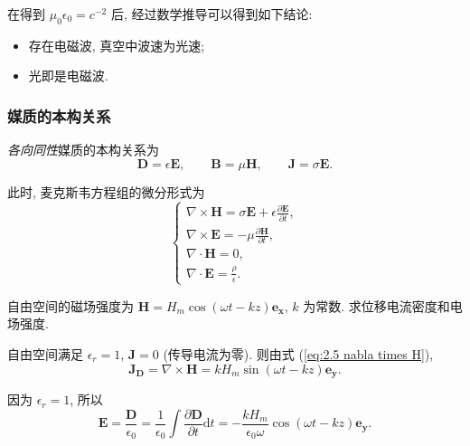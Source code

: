 在得到 $\mu_0\epsilon_0=c^{-2}$ 后, 经过数学推导可以得到如下结论:
\begin{itemize}
    \item 存在电磁波, 真空中波速为光速;
    \item 光即是电磁波.
\end{itemize}

\subsubsection{媒质的本构关系}
\textit{各向同性}媒质的本构关系为
\begin{equation} \label{eq:2.6 D B J}
    \bm{D}=\epsilon\bm{E}, \qquad \bm{B}=\mu\bm{H}, \qquad \bm{J}=\sigma\bm{E}.
\end{equation}

此时, 麦克斯韦方程组的微分形式为
\begin{equation}
    \begin{cases}
        \nabla\times\bm{H}=\sigma\bm{E}+\epsilon\frac{\partial\bm{E}}{\partial t}, \\
        \nabla\times\bm{E}=-\mu\frac{\partial\bm{H}}{\partial t},                  \\
        \nabla\cdot\bm{H}=0,                                                       \\
        \nabla\cdot\bm{E}=\frac{\rho}{\epsilon}.
    \end{cases}
\end{equation}

\begin{exampleprob}[自由空间的电学参数]
    自由空间的磁场强度为 $\bm{H}=H_m\cos(\omega t-kz)\bm{e_x}$, $k$ 为常数. 求位移电流密度和电场强度.

    \begin{solution}
        自由空间满足 $\epsilon_r=1$, $\bm{J}=0$ (传导电流为零). 则由式 (\ref{eq:2.5 nabla times H}),
        \begin{equation}
            \bm{J_D}=\nabla\times\bm{H}=kH_m\sin(\omega t-kz)\bm{e_y}.
        \end{equation}

        因为 $\epsilon_r=1$, 所以
        \begin{equation}
            \bm{E}=\frac{\bm{D}}{\epsilon_0}=\frac{1}{\epsilon_0}\int\frac{\partial\bm{D}}{\partial t}\mathrm{d}t=-\frac{kH_m}{\epsilon_0\omega}\cos(\omega t-kz)\bm{e_y}.
        \end{equation}
    \end{solution}
\end{exampleprob}
